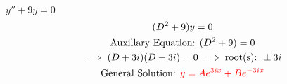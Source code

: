 \item [3.] $y''+9y=0$
\begin{gather*}
    (D^2+9)y=0\\
    \text{Auxillary Equation: }(D^2+9)=0\\
    \implies (D+3i)(D-3i)=0 \implies \text{root(s): } \pm 3i\\
    \text{General Solution: } \textcolor{red}{y=Ae^{3ix}+Be^{-3ix}}
\end{gather*}